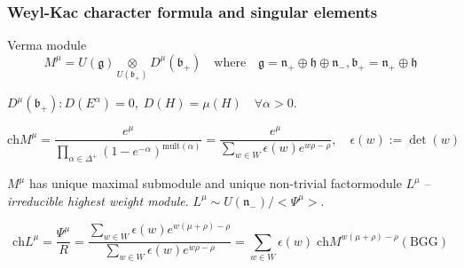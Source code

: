 \documentclass[pdftex]{beamer}
\newcommand{\gf}{\mathfrak{g}}
\newcommand{\bff}{\mathfrak{b}}
\newcommand{\hf}{\mathfrak{h}}
\theoremstyle{definition} \newtheorem{Def}{Definition}
\begin{document}
\begin{frame}
  \frametitle{Weyl-Kac character formula and singular elements}

Verma module
\begin{equation*}
 M^{\mu}=U(\gf)\underset{U(\bff_{+})}{\otimes} D^{\mu}(\bff_{+}) \quad \mbox{where} \quad     \gf=\mathfrak{n}_{+}\oplus \hf \oplus\mathfrak{n}_{-}, \bff_{+}=\mathfrak{n}_{+}\oplus \hf
\end{equation*}

$D^{\mu}(\bff_{+}): D(E^{\alpha})=0,\; D(H)=\mu(H)\quad \forall \alpha>0$.

\begin{equation*}
  \label{eq:11}
  \mathrm{ch} M^{\mu}=\frac{e^{\mu}}{\prod_{\alpha\in \Delta^{+}} \left( 1-e^{-\alpha}\right)^{\mathrm{mult}(\alpha)}}=\frac{e^{\mu}}{\sum_{w\in W} \epsilon(w) e^{w\rho-\rho}}, \quad \epsilon \left( w\right) :=\det \left( w\right)
\end{equation*}
  
$M^{\mu}$ has unique maximal submodule and unique non-trivial factormodule $L^{\mu}$ -- 
{\it irreducible highest weight module}. $L^{\mu}\sim U(\mathfrak{n}_{-})/<\Psi^{\mu}>$.

\begin{equation*}
  \label{eq:13}
  \mathrm{ch} L^{\mu}=\frac{\Psi^{\mu}}{R}=\frac{\sum_{w\in W} \epsilon(w) e^{w(\mu+\rho)-\rho}}{\sum_{w\in W}\epsilon(w) e^{w\rho-\rho}}=\sum_{w\in W} \epsilon(w)\; \mathrm{ch} M^{w(\mu+\rho)-\rho} (\mbox{BGG})
\end{equation*}

\end{frame}
\end{document}

